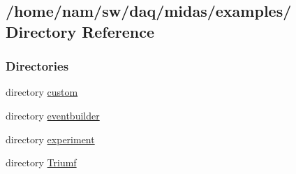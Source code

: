 \subsection{/home/nam/sw/daq/midas/examples/ Directory Reference}
\label{dir_df984a6dc4b1d10721bf65eb91241719}
\subsubsection*{Directories}
\begin{DoxyCompactItemize}
\item 
directory \hyperlink{dir_5110c29dda020bd4978fd5f040bdbd38}{custom}
\item 
directory \hyperlink{dir_d46e9f56217c104d716cc271ed25b691}{eventbuilder}
\item 
directory \hyperlink{dir_288d0dd33e80f6fcf7be362cbb57445e}{experiment}
\item 
directory \hyperlink{dir_b0429a58672f76ea50f1ba586d7ec660}{Triumf}
\end{DoxyCompactItemize}
